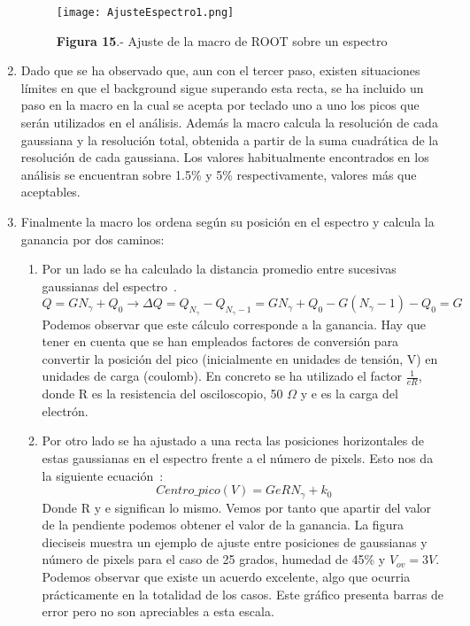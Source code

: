 \begin{enumerate}
\begin{figure}[hbtp]
\centering
\texttt{[image: AjusteEspectro1.png]}
\caption{\textbf{Figura 15}.- Ajuste de la macro de ROOT sobre un espectro}
\end{figure}

\item {} Dado que se ha observado que, aun con el tercer paso, existen situaciones límites en que el background sigue superando esta recta, se ha incluido un paso en la macro en la cual se acepta por teclado uno a uno los picos que serán utilizados en el análisis. Además la macro calcula la resolución de cada gaussiana y la resolución total, obtenida a partir de la suma cuadrática de la resolución de cada gaussiana. Los valores habitualmente encontrados en los análisis se encuentran sobre 1.5\% y 5\% respectivamente, valores más que aceptables.

\item {} Finalmente la macro los ordena según su posición en el espectro y calcula la ganancia por dos caminos:
	\begin{enumerate}

	\item {} Por un lado se ha calculado la distancia promedio entre sucesivas gaussianas del espectro~\cite{Hueso}.
	\begin{equation} 
	Q = G N_\gamma + Q_0 \longrightarrow \Delta Q= Q_{N_\gamma} - Q_{N_\gamma -1}=G N_\gamma+ Q_0 - G(N_		\gamma -1) - Q_0 = G
	\label{gananciametodo1}
	\end{equation}
	Podemos observar que este cálculo corresponde a la ganancia. Hay que tener en cuenta que se han empleados factores de conversión para convertir la posición del pico (inicialmente en unidades de	tensión, V) en unidades de carga (coulomb). En concreto se ha utilizado el factor $\frac{1}{eR}$, donde R es la resistencia del osciloscopio, 50 $\Omega$ y e es la carga del electrón.
	
	\item {} Por otro lado se ha ajustado a una recta las posiciones horizontales de estas gaussianas en el 	espectro frente a el número de pixels. Esto nos da la siguiente ecuación~\cite{Hueso}:
	\begin{equation}
	Centro\_pico(V) = GeRN_\gamma + k_0
	\label{gananciametodo2}
	\end{equation}
	Donde R y e significan lo mismo. Vemos por tanto que apartir del valor de la pendiente podemos obtener	el valor de la ganancia. La figura dieciseis muestra un ejemplo de ajuste entre posiciones de gaussianas y número de pixels para el caso de 25 grados, humedad de 45\% y $V_{ov}=3V$. Podemos observar que existe	un acuerdo excelente, algo que ocurria prácticamente en la totalidad de los casos. Este gráfico presenta barras de error pero no son apreciables a esta escala.
		

\end{enumerate}
\end{enumerate}
